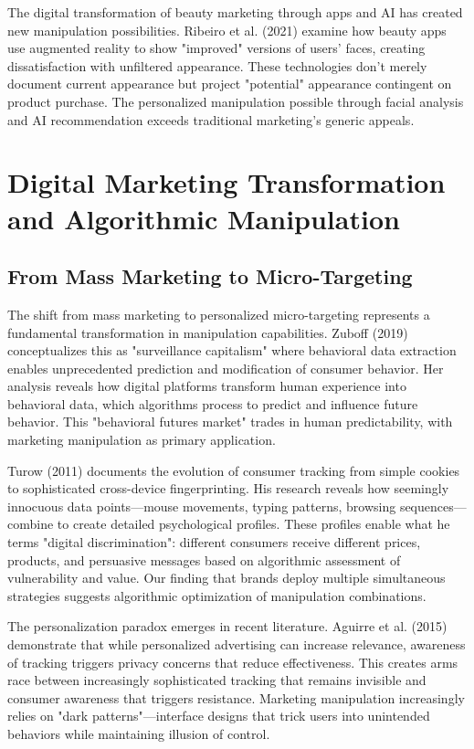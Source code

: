 The digital transformation of beauty marketing through apps and AI has created new manipulation possibilities. Ribeiro et al. (2021) examine how beauty apps use augmented reality to show "improved" versions of users' faces, creating dissatisfaction with unfiltered appearance. These technologies don't merely document current appearance but project "potential" appearance contingent on product purchase. The personalized manipulation possible through facial analysis and AI recommendation exceeds traditional marketing's generic appeals.

\section{Digital Marketing Transformation and Algorithmic Manipulation}
\label{sec:digital_lit}

\subsection{From Mass Marketing to Micro-Targeting}

The shift from mass marketing to personalized micro-targeting represents a fundamental transformation in manipulation capabilities. Zuboff (2019) conceptualizes this as "surveillance capitalism" where behavioral data extraction enables unprecedented prediction and modification of consumer behavior. Her analysis reveals how digital platforms transform human experience into behavioral data, which algorithms process to predict and influence future behavior. This "behavioral futures market" trades in human predictability, with marketing manipulation as primary application.

Turow (2011) documents the evolution of consumer tracking from simple cookies to sophisticated cross-device fingerprinting. His research reveals how seemingly innocuous data points—mouse movements, typing patterns, browsing sequences—combine to create detailed psychological profiles. These profiles enable what he terms "digital discrimination": different consumers receive different prices, products, and persuasive messages based on algorithmic assessment of vulnerability and value. Our finding that brands deploy multiple simultaneous strategies suggests algorithmic optimization of manipulation combinations.

The personalization paradox emerges in recent literature. Aguirre et al. (2015) demonstrate that while personalized advertising can increase relevance, awareness of tracking triggers privacy concerns that reduce effectiveness. This creates arms race between increasingly sophisticated tracking that remains invisible and consumer awareness that triggers resistance. Marketing manipulation increasingly relies on "dark patterns"—interface designs that trick users into unintended behaviors while maintaining illusion of control.

